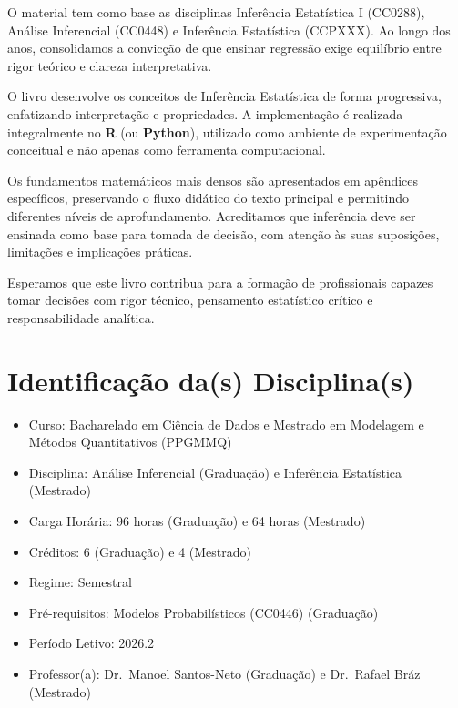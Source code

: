 \documentclass[
  letterpaper,
  DIV=11,
  numbers=noendperiod]{scrreprt}
\begin{document}
O material tem como base as disciplinas Inferência Estatística I
(CC0288), Análise Inferencial (CC0448) e Inferência Estatística
(CCPXXX). Ao longo dos anos, consolidamos a convicção de que ensinar
regressão exige equilíbrio entre rigor teórico e clareza interpretativa.

O livro desenvolve os conceitos de Inferência Estatística de forma
progressiva, enfatizando interpretação e propriedades. A implementação é
realizada integralmente no \textbf{R} (ou \textbf{Python}), utilizado
como ambiente de experimentação conceitual e não apenas como ferramenta
computacional.

Os fundamentos matemáticos mais densos são apresentados em apêndices
específicos, preservando o fluxo didático do texto principal e
permitindo diferentes níveis de aprofundamento. Acreditamos que
inferência deve ser ensinada como base para tomada de decisão, com
atenção às suas suposições, limitações e implicações práticas.

Esperamos que este livro contribua para a formação de profissionais
capazes tomar decisões com rigor técnico, pensamento estatístico crítico
e responsabilidade analítica.


\chapter*{Identificação da(s)
Disciplina(s)}\label{identificauxe7uxe3o-das-disciplinas}


\begin{itemize}
\item
  Curso: Bacharelado em Ciência de Dados e Mestrado em Modelagem e
  Métodos Quantitativos (PPGMMQ)
\item
  Disciplina: Análise Inferencial (Graduação) e Inferência Estatística
  (Mestrado)
\item
  Carga Horária: 96 horas (Graduação) e 64 horas (Mestrado)
\item
  Créditos: 6 (Graduação) e 4 (Mestrado)
\item
  Regime: Semestral
\item
  Pré-requisitos: Modelos Probabilísticos (CC0446) (Graduação)
\item
  Período Letivo: 2026.2
\item
  Professor(a): Dr.~Manoel Santos-Neto (Graduação) e Dr.~Rafael Bráz
  (Mestrado)
\end{itemize}
\end{document}
